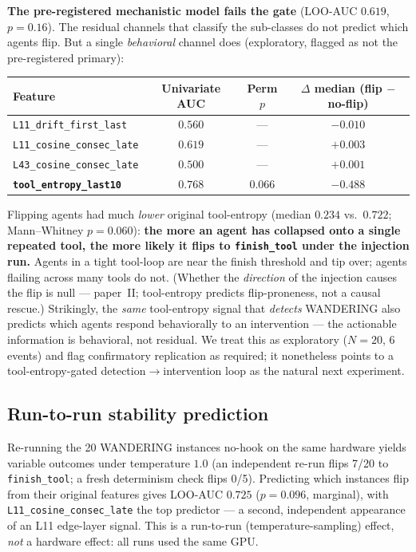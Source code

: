 \documentclass[11pt]{article}
\begin{document}
\textbf{The pre-registered mechanistic model fails the gate} (LOO-AUC $0.619$, $p{=}0.16$). The residual channels that classify the sub-classes do not predict which agents flip. But a single \emph{behavioral} channel does (exploratory, flagged as not the pre-registered primary):

\begin{center}
\begin{tabular}{lccc}
\toprule
Feature & Univariate AUC & Perm $p$ & $\Delta$ median (flip $-$ no-flip) \\
\midrule
\texttt{L11\_drift\_first\_last} & $0.560$ & --- & $-0.010$ \\
\texttt{L11\_cosine\_consec\_late} & $0.619$ & --- & $+0.003$ \\
\texttt{L43\_cosine\_consec\_late} & $0.500$ & --- & $+0.001$ \\
\textbf{\texttt{tool\_entropy\_last10}} & $\mathbf{0.768}$ & $\mathbf{0.066}$ & $\mathbf{-0.488}$ \\
\bottomrule
\end{tabular}
\end{center}

Flipping agents had much \emph{lower} original tool-entropy (median $0.234$ vs.\ $0.722$; Mann--Whitney $p{=}0.060$): \textbf{the more an agent has collapsed onto a single repeated tool, the more likely it flips to \texttt{finish\_tool} under the injection run.} Agents in a tight tool-loop are near the finish threshold and tip over; agents flailing across many tools do not. (Whether the \emph{direction} of the injection causes the flip is null --- paper~II; tool-entropy predicts flip-proneness, not a causal rescue.) Strikingly, the \emph{same} tool-entropy signal that \emph{detects} WANDERING \cite{toolentropy2026} also predicts which agents respond behaviorally to an intervention --- the actionable information is behavioral, not residual. We treat this as exploratory ($N{=}20$, 6 events) and flag confirmatory replication as required; it nonetheless points to a tool-entropy-gated detection$\to$intervention loop as the natural next experiment.

\subsection{Run-to-run stability prediction}

Re-running the 20 WANDERING instances no-hook on the same hardware yields variable outcomes under temperature $1.0$ (an independent re-run flips 7/20 to \texttt{finish\_tool}; a fresh determinism check flips 0/5). Predicting which instances flip from their original features gives LOO-AUC $0.725$ ($p{=}0.096$, marginal), with \texttt{L11\_cosine\_consec\_late} the top predictor --- a second, independent appearance of an L11 edge-layer signal. This is a run-to-run (temperature-sampling) effect, \emph{not} a hardware effect: all runs used the same GPU.
\end{document}
